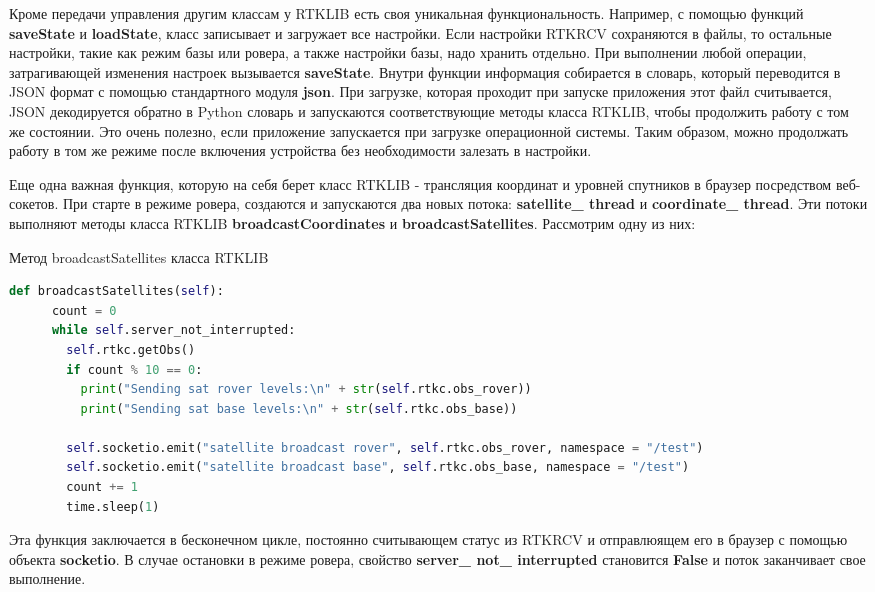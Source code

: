 Кроме передачи управления другим классам у RTKLIB есть своя уникальная функциональность. Например, с помощью функций \textbf{saveState} и \textbf{loadState}, класс записывает и загружает все настройки. Если настройки RTKRCV сохраняются в файлы, то остальные настройки, такие как режим базы или ровера, а также настройки базы, надо хранить отдельно. При выполнении любой операции, затрагивающей изменения настроек вызывается \textbf{saveState}. Внутри функции информация собирается в словарь, который переводится в JSON формат с помощью стандартного модуля \textbf{json}. При загрузке, которая проходит при запуске приложения этот файл считывается, JSON декодируется обратно в Python словарь и запускаются соответствующие методы класса RTKLIB, чтобы продолжить работу с том же состоянии. Это очень полезно, если приложение запускается при загрузке операционной системы. Таким образом, можно продолжать работу в том же режиме после включения устройства без необходимости залезать в настройки.

Еще одна важная функция, которую на себя берет класс RTKLIB - трансляция координат и уровней спутников в браузер посредством веб-сокетов. При старте в режиме ровера, создаются и запускаются два новых потока: \textbf{satellite\_ thread} и \textbf{coordinate\_ thread}. Эти потоки выполняют методы класса RTKLIB \textbf{broadcastCoordinates} и \textbf{broadcastSatellites}. Рассмотрим одну из них:

\begin{ListingEnv}[H]
  \caption{Метод broadcastSatellites класса RTKLIB}
  \label{list:hwbeauty}
  \begin{lstlisting}[language=Python]
    def broadcastSatellites(self):
      count = 0
      while self.server_not_interrupted:
        self.rtkc.getObs()
        if count % 10 == 0:
          print("Sending sat rover levels:\n" + str(self.rtkc.obs_rover))
          print("Sending sat base levels:\n" + str(self.rtkc.obs_base))

        self.socketio.emit("satellite broadcast rover", self.rtkc.obs_rover, namespace = "/test")
        self.socketio.emit("satellite broadcast base", self.rtkc.obs_base, namespace = "/test")
        count += 1
        time.sleep(1)
  \end{lstlisting}
\end{ListingEnv}

Эта функция заключается в бесконечном цикле, постоянно считывающем статус из RTKRCV и отправлюящем его в браузер с помощью объекта \textbf{socketio}. В случае остановки в режиме ровера, свойство \textbf{server\_ not\_ interrupted} становится \textbf{False} и поток заканчивает свое выполнение.

